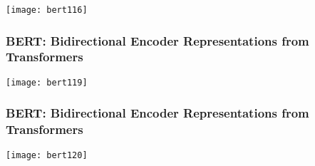 \begin{frame}[fragile]\frametitle{}


			\begin{center}
			\texttt{[image: bert116]}
			\end{center}		
			

\end{frame}


			


			


\begin{frame}[fragile]\frametitle{BERT: Bidirectional Encoder Representations from Transformers}

			\begin{center}
			\texttt{[image: bert119]}
			\end{center}		
			

\end{frame}

\begin{frame}[fragile]\frametitle{BERT: Bidirectional Encoder Representations from Transformers}

			\begin{center}
			\texttt{[image: bert120]}
			\end{center}		
			

\end{frame}

